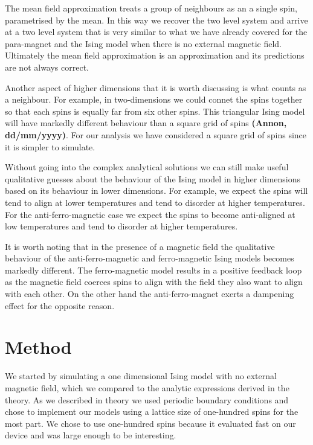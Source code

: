 \documentclass[a4paper]{article}
\def\citation{{\bfseries (Annon, dd/mm/yyyy)}}
\begin{document}
\begin{multicols}{2}
        The mean field approximation treats a group of neighbours as an %
        a single spin, parametrised by the mean. In this way we recover %
        the two level system and arrive at a two level system that is %
        very similar to what we have already covered for the para-magnet %
        and the Ising model when there is no external magnetic field. %
        Ultimately the mean field approximation is an approximation and %
        its predictions are not always correct. 


        Another aspect of higher dimensions that it is worth discussing %
        is what counts as a neighbour. For example, in two-dimensions %
        we could connet the spins together so that each spins is equally %
        far from six other spins. This triangular Ising model will have %
        markedly different behaviour than a square grid of spins \citation. %
        For our analysis we have considered a square grid of spins since %
        it is simpler to simulate. 


        Without going into the complex analytical solutions we can still %
        make useful qualitative guesses about the behaviour of the Ising %
        model in higher dimensions based on its behaviour in lower %
        dimensions. For example, we expect the spins will tend to align %
        at lower temperatures and tend to disorder at higher temperatures. %
        For the anti-ferro-magnetic case we expect the spins to become %
        anti-aligned at low temperatures and tend to disorder at higher %
        temperatures.


        It is worth noting that in the presence of a magnetic field the %
        qualitative behaviour of the anti-ferro-magnetic and ferro-magnetic %
        Ising models becomes markedly different. The ferro-magnetic model %
        results in a positive feedback loop as the magnetic field coerces %
        spins to align with the field they also want to align with each other.
        On the other hand the anti-ferro-magnet exerts a dampening effect %
        for the opposite reason. 


    \section*{Method}
        We started by simulating a one dimensional Ising model with no %
        external magnetic field, which we compared to the analytic %
        expressions derived in the theory. As we described in theory %
        we used periodic boundary conditions and chose to implement %
        our models using a lattice size of one-hundred spins for the %
        most part. We chose to use one-hundred spins because it evaluated %
        fast on our device and was large enough to be interesting. 



\end{multicols}
\end{document}
